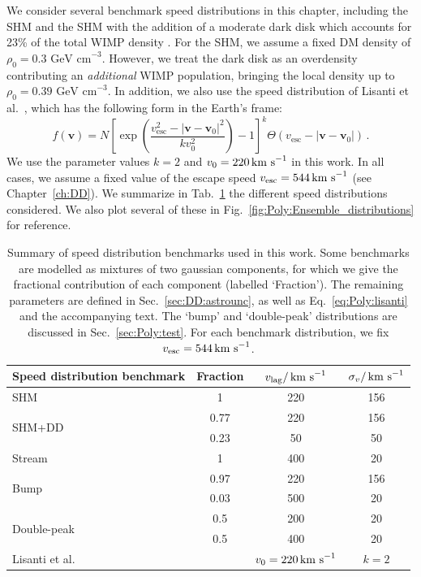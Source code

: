 We consider several benchmark speed distributions in this chapter, including the SHM and the SHM with the addition of a moderate dark disk which accounts for 23\% of the total WIMP density \cite{Pillepich:2014}. For the SHM, we assume a fixed DM density of $\rho_0 = 0.3 \textrm{ GeV cm}^{-3}$. However, we treat the dark disk as an overdensity contributing an \textit{additional} WIMP population, bringing the local density up to $\rho_0 = 0.39 \textrm{ GeV cm}^{-3}$. In addition, we also use the speed distribution of Lisanti et al.~\cite{Lisanti:2010}, which has the following form in the Earth's frame:
\begin{equation}
\label{eq:Poly:lisanti}
f(\textbf{v}) = N \left[\exp\left(\frac{v_\textrm{esc}^2 - |\textbf{v} - \textbf{v}_0|^2}{k v_0^2}\right) -1\right]^k \Theta(v_\textrm{esc} - |\textbf{v} - \textbf{v}_0|)\,.
\end{equation}
We use the parameter values $k = 2$ and $v_0 = 220 \,\textrm{km s}^{-1}$ in this work. In all cases, we assume a fixed value of the escape speed $\vesc = 544 \kms$ (see Chapter~\ref{ch:DD}). We summarize in Tab.~\ref{tab:Poly:distributions} the different speed distributions considered. We also plot several of these in Fig.~\ref{fig:Poly:Ensemble_distributions} for reference.

\begin{table}[t]
  \setlength{\extrarowheight}{2pt}
  \setlength{\tabcolsep}{3pt}
  \begin{center}
	\begin{tabular}{m{3cm}|ccc}
        \hline \hline
	Speed distribution benchmark & Fraction & $v_\textrm{lag} / \,\textrm{km s}^{-1}$ & $\sigma_v / \,\textrm{km s}^{-1}$ \\
        \hline
	SHM & 1 & 220 & 156 \\
	\hline
	\multirow{2}{*}{SHM+DD} & 0.77 & 220 & 156 \\
	& 0.23 & 50 & 50 \\
	\hline
	Stream & 1 & 400 & 20 \\
	\hline
	\multirow{2}{*}{Bump} & 0.97 & 220 & 156 \\
	& 0.03 & 500 & 20 \\
	\hline
	\multirow{2}{*}{Double-peak} & 0.5 & 200 & 20 \\
	& 0.5 & 400 & 20 \\
	\hline
	Lisanti et al. & & $v_0 = 220 \,\textrm{km s}^{-1}$ & $k = 2$ \\
        \hline \hline
	\end{tabular}
        
  \end{center}
\caption[Summary of speed distribution benchmarks used in Chapter \ref{ch:Poly}]{Summary of speed distribution benchmarks used in this work. Some benchmarks are modelled as mixtures of two gaussian components, for which we give the fractional contribution of each component (labelled `Fraction'). The remaining parameters are defined in Sec.~\ref{sec:DD:astrounc}, as well as Eq.~\ref{eq:Poly:lisanti} and the accompanying text. The `bump' and `double-peak' distributions are discussed in Sec.~\ref{sec:Poly:test}. For each benchmark distribution, we fix $\vesc = 544 \kms$.}
\label{tab:Poly:distributions}
\end{table}

